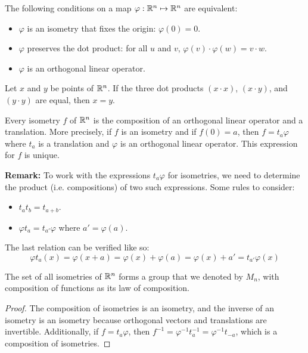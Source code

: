 \documentclass[letterpaper]{article}
\begin{document}
\begin{theorem}{}{}
    The following conditions on a map $\varphi: \mathbb{R}^n \mapsto \mathbb{R}^n$ are equivalent: 
    \begin{itemize}
        \item $\varphi$ is an isometry that fixes the origin: $\varphi(0) = 0$. 
        \item $\varphi$ preserves the dot product: for all $u$ and $v$, $\varphi(v) \cdot \varphi(w) = v \cdot w$.
        \item $\varphi$ is an orthogonal linear operator. 
    \end{itemize}
\end{theorem}

\begin{lemma}{}{}
    Let $x$ and $y$ be points of $\mathbb{R}^n$. If the three dot products $(x \cdot x)$, $(x \cdot y)$, and $(y \cdot y)$ are equal, then $x = y$.  
\end{lemma}

\begin{corollary}{}{}
    Every isometry $f$ of $\mathbb{R}^n$ is the composition of an orthogonal linear operator and a translation. More precisely, if $f$ is an isometry and if $f(0) = a$, then $f = t_{a}\varphi$ where $t_a$ is a translation and $\varphi$ is an orthogonal linear operator. This expression for $f$ is unique. 
\end{corollary}
\textbf{Remark:} To work with the expressions $t_a \varphi$ for isometries, we need to determine the product (i.e. compositions) of two such expressions. Some rules to consider: 
\begin{itemize}
    \item $t_a t_b = t_{a + b}$.
    \item $\varphi t_a = t_{a'}\varphi$ where $a' = \varphi(a)$. 
\end{itemize}
The last relation can be verified like so:
\[\varphi t_{a}(x) = \varphi(x + a) = \varphi(x) + \varphi(a) = \varphi(x) + a' = t_{a'}\varphi(x)\]

\begin{corollary}{}{}
    The set of all isometries of $\mathbb{R}^n$ forms a group that we denoted by $M_n$, with composition of functions as its law of composition. 
\end{corollary}

\begin{mdframed}
    \begin{proof}
        The composition of isometries is an isometry, and the inverse of an isometry is an isometry because orthogonal vectors and translations are invertible. Additionally, if $f = t_a \varphi$, then $f^{-1} = \varphi^{-1} t_{a}^{-1} = \varphi^{-1} t_{-a}$, which is a composition of isometries. 
    \end{proof}
\end{mdframed}
\end{document}
